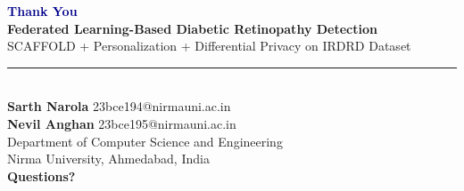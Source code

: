 \documentclass[aspectratio=169, 11pt]{beamer}
\begin{document}
\begin{frame}
  \vspace{10pt}
  \begin{center}
    {\Huge \textbf{\textcolor{darkblue}{Thank You}}}\\[16pt]
    {\large \textbf{Federated Learning-Based Diabetic Retinopathy Detection}}\\[6pt]
    {\normalsize SCAFFOLD + Personalization + Differential Privacy on IRDRD Dataset}\\[16pt]
    \textcolor{darkblue}{\rule{0.7\textwidth}{0.5pt}}\\[10pt]
    \textbf{Sarth Narola} \quad 23bce194@nirmauni.ac.in\\[4pt]
    \textbf{Nevil Anghan} \quad 23bce195@nirmauni.ac.in\\[10pt]
    Department of Computer Science and Engineering\\
    Nirma University, Ahmedabad, India\\[12pt]
    {\large \textbf{Questions?}}
  \end{center}
\end{frame}

\end{document}
